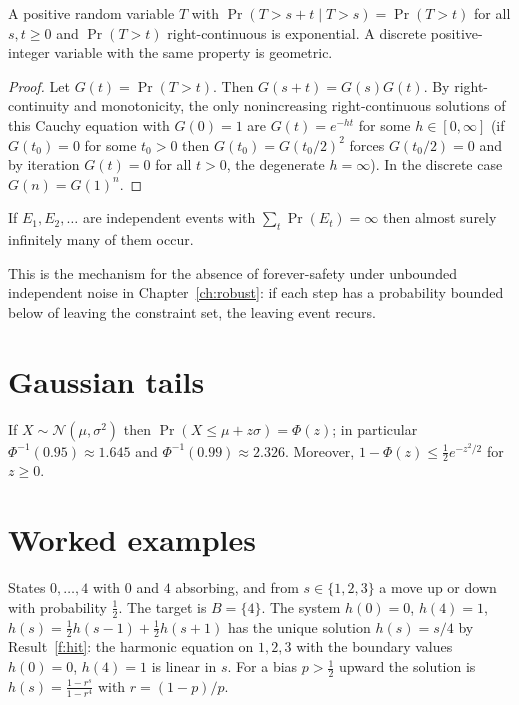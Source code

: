\begin{newresult}\label{f:memoryless}
A positive random variable $T$ with $\Pr(T>s+t\mid T>s)=\Pr(T>t)$ for all $s,t\ge0$ and $\Pr(T>t)$ right-continuous is exponential. A discrete positive-integer variable with the same property is geometric.
\end{newresult}
\begin{proof}
Let $G(t)=\Pr(T>t)$. Then $G(s+t)=G(s)G(t)$. By right-continuity and monotonicity, the only nonincreasing right-continuous solutions of this Cauchy equation with $G(0)=1$ are $G(t)=e^{-ht}$ for some $h\in[0,\infty]$ (if $G(t_0)=0$ for some $t_0>0$ then $G(t_0)=G(t_0/2)^2$ forces $G(t_0/2)=0$ and by iteration $G(t)=0$ for all $t>0$, the degenerate $h=\infty$). In the discrete case $G(n)=G(1)^n$.
\end{proof}

\begin{established}\label{f:bc}
If $E_1,E_2,\dots$ are independent events with $\sum_t\Pr(E_t)=\infty$ then almost surely infinitely many of them occur.
\end{established}

This is the mechanism for the absence of forever-safety under unbounded independent noise in Chapter~\ref{ch:robust}: if each step has a probability bounded below of leaving the constraint set, the leaving event recurs.

\section{Gaussian tails}

\begin{established}\label{f:gauss}
If $X\sim\mathcal N(\mu,\sigma^2)$ then $\Pr(X\le\mu+z\sigma)=\Phi(z)$; in particular $\Phi^{-1}(0.95)\approx1.645$ and $\Phi^{-1}(0.99)\approx2.326$. Moreover, $1-\Phi(z)\le\tfrac12e^{-z^2/2}$ for $z\ge0$.
\end{established}

\section{Worked examples}

\begin{example}\label{f:ex-gambler}
States $0,\dots,4$ with $0$ and $4$ absorbing, and from $s\in\{1,2,3\}$ a move up or down with probability $\tfrac12$. The target is $B=\{4\}$. The system $h(0)=0$, $h(4)=1$, $h(s)=\tfrac12h(s-1)+\tfrac12h(s+1)$ has the unique solution $h(s)=s/4$ by Result~\ref{f:hit}: the harmonic equation on $1,2,3$ with the boundary values $h(0)=0$, $h(4)=1$ is linear in $s$. For a bias $p>\tfrac12$ upward the solution is $h(s)=\frac{1-r^s}{1-r^4}$ with $r=(1-p)/p$.
\end{example}

